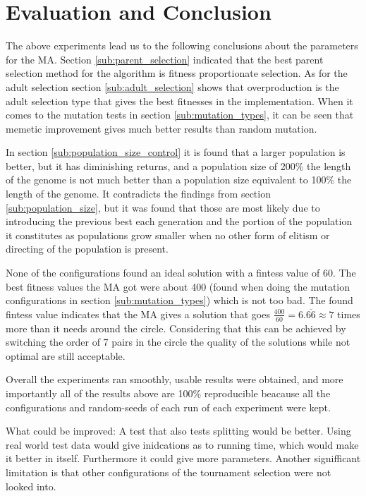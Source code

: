 \clearpage


\section{Evaluation and Conclusion} %
\label{sec:evaluation_and_conclusion}

The above experiments lead us to the following conclusions about the parameters for the MA. Section \ref{sub:parent_selection} indicated that the best parent selection method for the algorithm is fitness proportionate selection. As for the adult selection section \ref{sub:adult_selection} shows that overproduction is the adult selection type that gives the best fitnesses in the implementation. When it comes to the mutation tests in section \ref{sub:mutation_types}, it can be seen that memetic improvement gives much better results than random mutation.

In section \ref{sub:population_size_control} it is found that a larger population is better, but it has diminishing returns, and a population size of 200\% the length of the genome is not much better than a population size equivalent to 100\% the length of the genome. It contradicts the findings from section \ref{sub:population_size}, but it was found that those are most likely due to introducing the previous best each generation and the portion of the population it constitutes as populations grow smaller when no other form of elitism or directing of the population is present.

None of the configurations found an ideal solution with a fintess value of 60. The best fitness values the MA got were about 400 (found when doing the mutation configurations in section \ref{sub:mutation_types}) which is not too bad. The found fintess value indicates that the MA gives a solution that goes $\frac{400}{60} = 6.\overline{66} \approx 7$ times more than it needs around the circle. Considering that this can be achieved by switching the order of 7 pairs in the circle the quality of the solutions while not optimal are still acceptable.

Overall the experiments ran smoothly, usable results were obtained, and more importantly all of the results above are 100\% reproducible beacause all the configurations and random-seeds of each run of each experiment were kept.

What could be improved: A test that also tests splitting would be better. Using real world test data would give inidcations as to running time, which would make it better in itself. Furthermore it could give more parameters. Another signifficant limitation is that other configurations of the tournament selection were not looked into.

